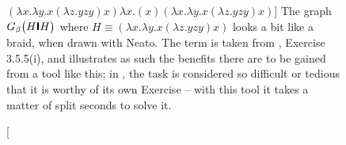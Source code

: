 \begin{figure}[htbp]
{	}
	\caption
	[$(\lambda x.\lambda y.x (\lambda z.y z y) x) \lambda x.(x) (\lambda x.\lambda y.x (\lambda z.y z y) x)$]
	{The graph $G_\beta\big(H\textsf{\textbf{I}} H\big)$ where $H\equiv(\lambda x.\lambda y.x (\lambda z.y z y) x)$
	looks a bit like a braid, when drawn with Neato. The term is taken from \cite{Barendregt},
	Exercise 3.5.5(i), and illustrates as such the benefits there are to be gained from
	a tool like this; in \cite{Barendregt}, the task is considered so difficult 
	or tedious that it is worthy of its own Exercise -- with this tool it takes a matter 
	of split seconds to solve it.}
	\label{fig:images_Bohm1_CIRCO}
\end{figure}



% 




